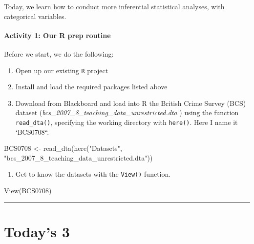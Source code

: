 \documentclass[
]{book}
\newenvironment{Shaded}{\begin{snugshade}}{\end{snugshade}}
\newcommand{\FunctionTok}[1]{\textcolor[rgb]{0.00,0.00,0.00}{#1}}
\newcommand{\NormalTok}[1]{#1}
\newcommand{\OtherTok}[1]{\textcolor[rgb]{0.56,0.35,0.01}{#1}}
\newcommand{\StringTok}[1]{\textcolor[rgb]{0.31,0.60,0.02}{#1}}
\providecommand{\tightlist}{%
  \setlength{\itemsep}{0pt}\setlength{\parskip}{0pt}}
\begin{document}
Today, we learn how to conduct more inferential statistical analyses, with categorical variables.

\hypertarget{activity-1-our-r-prep-routine}{%
\paragraph{Activity 1: Our R prep routine}\label{activity-1-our-r-prep-routine}}

Before we start, we do the following:

\begin{enumerate}
\def\labelenumi{\arabic{enumi}.}
\item
  Open up our existing \texttt{R} project
\item
  Install and load the required packages listed above
\item
  Download from Blackboard and load into R the British Crime Survey (BCS) dataset (\emph{bcs\_2007\_8\_teaching\_data\_unrestricted.dta} ) using the function \texttt{read\_dta()}, specifying the working directory with \texttt{here()}. Here I name it `BCS0708``.
\end{enumerate}

\begin{Shaded}
\begin{Highlighting}[]
\NormalTok{BCS0708 }\OtherTok{\textless{}{-}} \FunctionTok{read\_dta}\NormalTok{(}\FunctionTok{here}\NormalTok{(}\StringTok{"Datasets"}\NormalTok{, }\StringTok{"bcs\_2007\_8\_teaching\_data\_unrestricted.dta"}\NormalTok{))}
\end{Highlighting}
\end{Shaded}

\begin{enumerate}
\def\labelenumi{\arabic{enumi}.}
\setcounter{enumi}{3}
\tightlist
\item
  Get to know the datasets with the \texttt{View()} function.
\end{enumerate}

\begin{Shaded}
\begin{Highlighting}[]
\FunctionTok{View}\NormalTok{(BCS0708)}
\end{Highlighting}
\end{Shaded}

\begin{center}\rule{0.5\linewidth}{0.5pt}\end{center}

\hypertarget{todays-3-4}{%
\section{Today's 3}\label{todays-3-4}}
\end{document}
